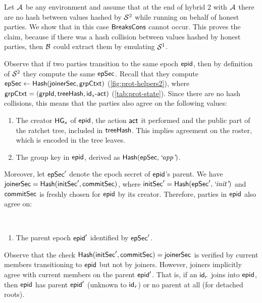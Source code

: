 Let $\mathcal{A}_{\relax}$ be any environment and assume that at the end of hybrid 2 with $\mathcal{A}_{\relax}$ there are no hash between values hashed by $\mathcal{S}_{\textsc{\relax}}^2$ while running \saik on behalf of honest parties. We show that in this case $\textnormal{\textsf{BreaksCons}}$ cannot occur. This proves the claim, because if there was a hash collision between values hashed by honest parties, then $\mathcal{B}_{\relax}$ could extract them by emulating $\mathcal{S}_{\textsc{\relax}}^1$.

Observe that if two parties transition to the same epoch ${\normalfont\textsf{epid}}$, then by definition of $\mathcal{S}_{\textsc{\relax}}^2$ they compute the same ${\mathsf{epSec}}$. Recall that they compute ${\mathsf{epSec}} \gets {\ensuremath{\mathsf{Hash}}}({\mathsf{joinerSec}}, {\mathsf{grpCtxt}})$ (\cref{fig:prot-helpers2}), where ${\mathsf{grpCtxt}}=({\mathsf{grpId}}, {\mathsf{treeHash}}, {\mathsf{id}}_s\textrm{-}\mathsf{act})$ (\cref{tab:prot-state}).
Since there are no hash collisions, this means that the parties also agree on the following values:
\begin{enumerate}[label=\alph*)]
  \item The creator ${\mathsf{HG}}_s$ of ${\normalfont\textsf{epid}}$, the action $\mathsf{act}$ it performed and the public part of the ratchet tree, included in ${\mathsf{treeHash}}$. This implies agreement on the roster, which is encoded in the tree leaves.
  \item The group key in ${\normalfont\textsf{epid}}$, derived as ${\mathsf{Hash}}({\mathsf{epSec}}, {\text{\normalfont \it`app'}})$.
\end{enumerate}

Moreover, let ${\mathsf{epSec}}'$ denote the epoch secret of ${\normalfont\textsf{epid}}$'s parent. We have ${\mathsf{joinerSec}} = {\mathsf{Hash}}({\mathsf{initSec}}', {\mathsf{commitSec}})$, where ${\mathsf{initSec}}' = {\mathsf{Hash}}({\mathsf{epSec}}', {\text{\normalfont \it`init'}})$ and ${\mathsf{commitSec}}$ is freshly chosen for ${\normalfont\textsf{epid}}$ by its creator. Therefore, parties in ${\normalfont\textsf{epid}}$ also agree on:\\
\begin{minipage}{\linewidth}~
\begin{enumerate}[label=\alph*),start=3]
  \item The parent epoch ${\normalfont\textsf{epid}}'$ identified by ${\mathsf{epSec}}'$.
\end{enumerate}
\end{minipage}

\medskip\noindent Observe that the check ${\mathsf{Hash}}({\mathsf{initSec}}', {\mathsf{commitSec}})={\mathsf{joinerSec}}$ is verified by current members transitioning to ${\normalfont\textsf{epid}}$ but not by joiners. However, joiners implicitly agree with current members on the parent ${\normalfont\textsf{epid}}'$. That is, if an ${\mathsf{id}}_r$ joins into ${\normalfont\textsf{epid}}$, then ${\normalfont\textsf{epid}}$ has parent ${\normalfont\textsf{epid}}'$ (unknown to ${\mathsf{id}}_r$) or no parent at all (for detached roots).

